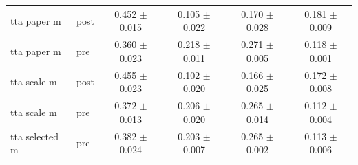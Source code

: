\begin{tabular}{llcccc}
tta paper m & post & 0.452 $\pm$ 0.015 & 0.105 $\pm$ 0.022 & 0.170 $\pm$ 0.028 & 0.181 $\pm$ 0.009 \\
tta paper m & pre & 0.360 $\pm$ 0.023 & 0.218 $\pm$ 0.011 & 0.271 $\pm$ 0.005 & 0.118 $\pm$ 0.001 \\
tta scale m & post & 0.455 $\pm$ 0.023 & 0.102 $\pm$ 0.020 & 0.166 $\pm$ 0.025 & 0.172 $\pm$ 0.008 \\
tta scale m & pre & 0.372 $\pm$ 0.013 & 0.206 $\pm$ 0.020 & 0.265 $\pm$ 0.014 & 0.112 $\pm$ 0.004 \\
tta selected m & pre & 0.382 $\pm$ 0.024 & 0.203 $\pm$ 0.007 & 0.265 $\pm$ 0.002 & 0.113 $\pm$ 0.006 \\
\bottomrule
\end{tabular}